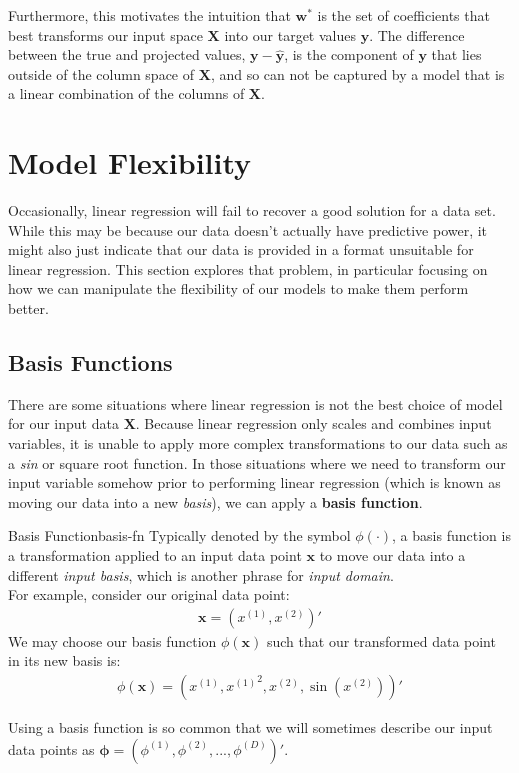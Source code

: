 Furthermore, this motivates the intuition that $\textbf{w}^{*}$ is the set of coefficients that best transforms our input space $\textbf{X}$ into our target values $\textbf{y}$. The difference between the true and projected values, $\textbf{y} - \hat{\textbf{y}}$, is the component of $\textbf{y}$ that lies outside of the column space of $\textbf{X}$, and so can not be captured by a model that is a linear combination of the columns of $\textbf{X}$.

\section{Model Flexibility}
Occasionally, linear regression will fail to recover a good solution for a data set. While this may be because our data doesn't actually have predictive power, it might also just indicate that our data is provided in a format unsuitable for linear regression. This section explores that problem, in particular focusing on how we can manipulate the flexibility of our models to make them perform better.

\subsection{Basis Functions}
There are some situations where linear regression is not the best choice of model for our input data $\textbf{X}$. Because linear regression only scales and combines input variables, it is unable to apply more complex transformations to our data such as a \textit{sin} or square root function. In those situations where we need to transform our input variable somehow prior to performing linear regression (which is known as moving our data into a new \textit{basis}), we can apply a \textbf{basis function}.

\begin{definition}{Basis Function}{basis-fn}
    Typically denoted by the symbol $\phi(\cdot)$, a basis function is a transformation applied to an input data point $\textbf{x}$ to move our data into a different \textit{input basis}, which is another phrase for \textit{input domain}. \\

    For example, consider our original data point:
    \begin{align*}
    \textbf{x} = (x^{(1)}, x^{(2)})'
    \end{align*}
    We may choose our basis function $\phi(\textbf{x})$ such that our transformed data point in its new basis is:
    \begin{align*}
        \phi(\textbf{x}) = (x^{(1)}, {x^{(1)}}^2, x^{(2)}, \sin(x^{(2)}))'
    \end{align*}

    Using a basis function is so common that we will sometimes describe our input data points as $\boldsymbol{\phi} = (\phi^{(1)}, \phi^{(2)}, ..., \phi^{(D)})'$.
\end{definition}

